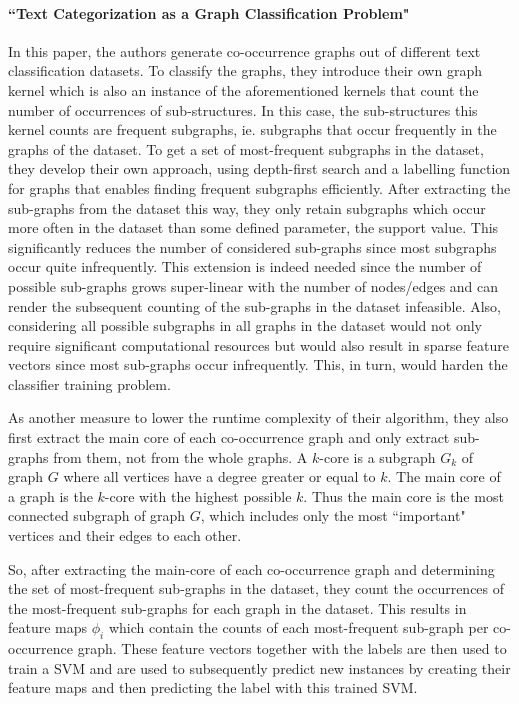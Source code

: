 \paragraph{``Text Categorization as a Graph Classification Problem" \cite{Rousseau2015a}}
In this paper, the authors generate co-occurrence graphs out of different text classification datasets.
To classify the graphs, they introduce their own graph kernel which is also an instance of the aforementioned kernels that count the number of occurrences of sub-structures.
In this case, the sub-structures this kernel counts are frequent subgraphs, ie. subgraphs that occur frequently in the graphs of the dataset.
To get a set of most-frequent subgraphs in the dataset, they develop their own approach, using depth-first search and a labelling function for graphs that enables finding frequent subgraphs efficiently.
After extracting the sub-graphs from the dataset this way, they only retain subgraphs which occur more often in the dataset than some defined parameter, the support value.
This significantly reduces the number of considered sub-graphs since most subgraphs occur quite infrequently.
This extension is indeed needed since the number of possible sub-graphs grows super-linear with the number of nodes/edges and can render the subsequent counting of the sub-graphs in the dataset infeasible.
Also, considering all possible subgraphs in all graphs in the dataset would not only require significant computational resources but would also result in sparse feature vectors since most sub-graphs occur infrequently.
This, in turn, would harden the classifier training problem.

As another measure to lower the runtime complexity of their algorithm, they also first extract the main core of each co-occurrence graph and only extract sub-graphs from them, not from the whole graphs.
A $k$-core is a subgraph $G_k$ of graph $G$ where all vertices have a degree greater or equal to $k$. The main core of a graph is the $k$-core with the highest possible $k$.
Thus the main core is the most connected subgraph of graph $G$, which includes only the most ``important" vertices and their edges to each other.

So, after extracting the main-core of each co-occurrence graph and determining the set of most-frequent sub-graphs in the dataset, they count the occurrences of the most-frequent sub-graphs for each graph in the dataset.
This results in feature maps $\phi_i$ which contain the counts of each most-frequent sub-graph per co-occurrence graph.
These feature vectors together with the labels are then used to train a SVM and are used to subsequently predict new instances by creating their feature maps and then predicting the label with this trained SVM.

